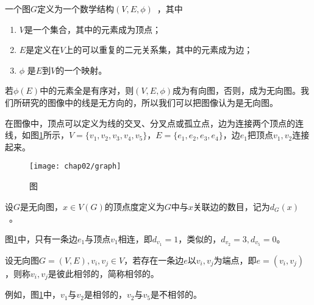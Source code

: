 \begin{definition}
一个图$G$定义为一个数学结构$(V, E, \phi)$~\cite{xujunming}，其中
\begin{enumerate}
\item $V$是一个集合，其中的元素成为顶点；
\item $E$是定义在$V$上的可以重复的二元关系集，其中的元素成为边；
\item $\phi$ 是$E$到$V$的一个映射。 
\end{enumerate}
若$\phi(E)$中的元素全是有序对，则$(V, E, \phi)$成为有向图，否则，成为无向图。我们所研究的图像中的线是无方向的，所以我们可以把图像认为是无向图。
\end{definition}

在图像中，顶点可以定义为线的交叉、分叉点或孤立点，边为连接两个顶点的连线，如图\ref{fig:graph}所示，$V = \{v_1, v_2, v_3, v_4, v_5\}$，$E = \{e_1, e_2, e_3, e_4\}$，边$e_1$把顶点$v_1, v_2$连接起来。

\begin{figure}[H] %
  \centering
  \texttt{[image: chap02/graph]}
  \caption{图}
  \label{fig:graph}
\end{figure}

\begin{definition}
设$G$是无向图，$x\in V(G)$的顶点度定义为$G$中与$x$关联边的数目，记为$d_{G}(x)$~\cite{wangshuhe}。
\end{definition}

图\ref{fig:graph}中，只有一条边$e_1$与顶点$v_1$相连，即$d_{v_1}=1$，类似的，$d_{v_2}=3, d_{v_5}=0$。


\begin{definition}
设无向图$G = (V, E), v_i, v_j \in V$，若存在一条边$e$以$v_i, v_j$为端点，即$e = (v_i, v_j)$，则称$v_i, v_j$是彼此相邻的，简称相邻的。 
\end{definition}
例如，图\ref{fig:graph}中，$v_1$与$v_2$是相邻的，$v_2$与$v_5$是不相邻的。

